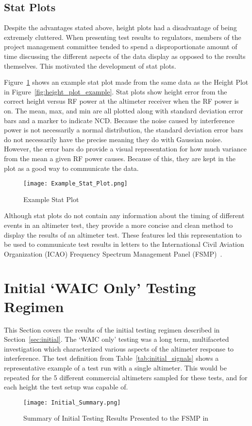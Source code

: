 \subsection{Stat Plots}
Despite the advantages stated above, height plots had a disadvantage of being extremely cluttered. When presenting test results to regulators, members of the project management committee tended to spend a disproportionate amount of time discussing the different aspects of the data display as opposed to the results themselves. This motivated the development of stat plots.

Figure~\ref{fig:stat_plot_example} shows an example stat plot made from the same data as the Height Plot in Figure~\ref{fig:height_plot_example}. Stat plots show height error from the correct height versus RF power at the altimeter receiver when the RF power is on. The mean, max, and min are all plotted along with standard deviation error bars and a marker to indicate NCD. Because the noise caused by interference power is not necessarily a normal distribution, the standard deviation error bars do not necessarily have the precise meaning they do with Gaussian noise. However, the error bars do provide a visual representation for how much variance from the mean a given RF power causes. Because of this, they are kept in the plot as a good way to communicate the data.  
\begin{figure}[h!]
	\centering
	\texttt{[image: Example\_Stat\_Plot.png]}
	\caption{Example Stat Plot}
	\label{fig:stat_plot_example}
\end{figure}

 Although stat plots do not contain any information about the timing of different events in an altimeter test, they provide a more concise and clean method to display the results of an altimeter test. These features led this representation to be used to communicate test results in letters to the International Civil Aviation Organization (ICAO) Frequency Spectrum Management Panel (FSMP)~\cite{uwe_radio_2019}. 
 
 
\section{Initial `WAIC Only' Testing Regimen}\label{sec:initial_results}
This Section covers the results of the initial testing regimen described in Section~\ref{sec:initial}. The `WAIC only' testing was a long term, multifaceted investigation which characterized various aspects of the altimeter response to interference. The test definition from Table~\ref{tab:initial_signals} shows a representative example of a test run with a single altimeter. This would be repeated for the 5 different commercial altimeters sampled for these tests, and for each height the test setup was capable of. 
\begin{figure}[h!]
	\centering
	\texttt{[image: Initial\_Summary.png]}
	\caption{Summary of Initial Testing Results Presented to the FSMP in~\cite{uwe_radio_2019}}
	\label{fig:initial_summary}
\end{figure}

